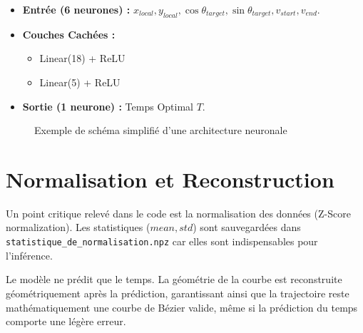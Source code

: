 \documentclass[12pt]{report}
\theoremstyle{plain}
\begin{document}
\begin{itemize}
    \item \textbf{Entrée (6 neurones) :} $x_{local}, y_{local}, \cos\theta_{target}, \sin\theta_{target}, v_{start}, v_{end}$.
    \item \textbf{Couches Cachées :} 
        \begin{itemize}
            \item Linear(18) + ReLU
            \item Linear(5) + ReLU
        \end{itemize}
    \item \textbf{Sortie (1 neurone) :} Temps Optimal $T$.
\end{itemize}

\begin{figure}[h]
\centering
{}
\caption{Exemple de schéma simplifié d'une architecture neuronale}
\end{figure}

\section{Normalisation et Reconstruction}
Un point critique relevé dans le code est la normalisation des données (Z-Score normalization). Les statistiques ($mean, std$) sont sauvegardées dans \texttt{statistique\_de\_normalisation.npz} car elles sont indispensables pour l'inférence.

Le modèle ne prédit que le temps. La géométrie de la courbe est reconstruite géométriquement après la prédiction, garantissant ainsi que la trajectoire reste mathématiquement une courbe de Bézier valide, même si la prédiction du temps comporte une légère erreur.
\end{document}
